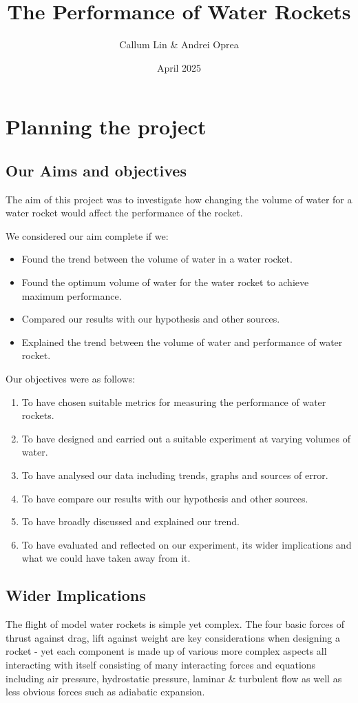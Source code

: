 \documentclass[14pt]{article}
\title{The Performance of Water Rockets}
\author{Callum Lin \& Andrei Oprea}
\date{April 2025}
\begin{document}

\maketitle
\tableofcontents
\section{Planning the project}
\subsection{Our Aims and objectives}
The aim of this project was to investigate how changing the volume of water for a water rocket would affect the performance of the rocket.

We considered our aim complete if we:
\begin{itemize}
    \item Found the trend between the volume of water in a water rocket.
    \item Found the optimum volume of water for the water rocket to achieve maximum performance.
    \item Compared our results with our hypothesis and other sources.
    \item Explained the trend between the volume of water and performance of water rocket.
\end{itemize}
Our objectives were as follows:
\begin{enumerate}
    \item To have chosen suitable metrics for measuring the performance of water rockets.
    \item To have designed and carried out a suitable experiment at varying volumes of water.
    \item To have analysed our data including trends, graphs and sources of error.
    \item To have compare our results with our hypothesis and other sources.
    \item To have broadly discussed and explained our trend.
    \item To have evaluated and reflected on our experiment, its wider implications and what we could have taken away from it.
\end{enumerate}
\subsection{Wider Implications}
The flight of model water rockets is simple yet complex. The four basic forces of thrust against drag, lift against weight are key considerations when designing a rocket - yet each component is made up of various more complex aspects all interacting with itself consisting of many interacting forces and equations including air pressure, hydrostatic pressure, laminar \& turbulent flow as well as less obvious forces such as adiabatic expansion.
\end{document}
